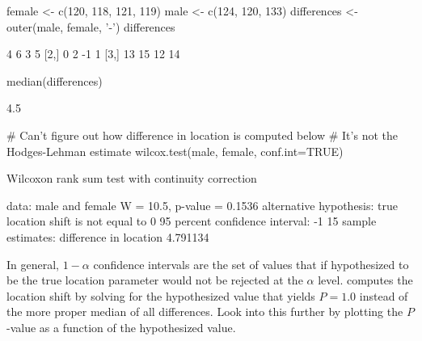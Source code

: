 \begin{Schunk}
\begin{Sinput}
female <- c(120, 118, 121, 119)
male   <- c(124, 120, 133)
differences <- outer(male, female, '-')
differences
\end{Sinput}
\begin{Soutput}
     [,1] [,2] [,3] [,4]
[1,]    4    6    3    5
[2,]    0    2   -1    1
[3,]   13   15   12   14
\end{Soutput}
\begin{Sinput}
median(differences)
\end{Sinput}
\begin{Soutput}
[1] 4.5
\end{Soutput}
\begin{Sinput}
# Can't figure out how difference in location is computed below
# It's not the Hodges-Lehman estimate
wilcox.test(male, female, conf.int=TRUE)
\end{Sinput}
\begin{Soutput}

	Wilcoxon rank sum test with continuity correction

data:  male and female
W = 10.5, p-value = 0.1536
alternative hypothesis: true location shift is not equal to 0
95 percent confidence interval:
 -1 15
sample estimates:
difference in location 
              4.791134 
\end{Soutput}
\end{Schunk}
In general, $1 - \alpha$ confidence intervals are the set of values that if
hypothesized to be the true location parameter would not be rejected
at the $\alpha$ level.   computes the location shift
by solving for the hypothesized value that yields $P=1.0$ instead of
the more proper median of all differences.  Look into this further by
plotting the $P$-value as a function of the hypothesized value.
